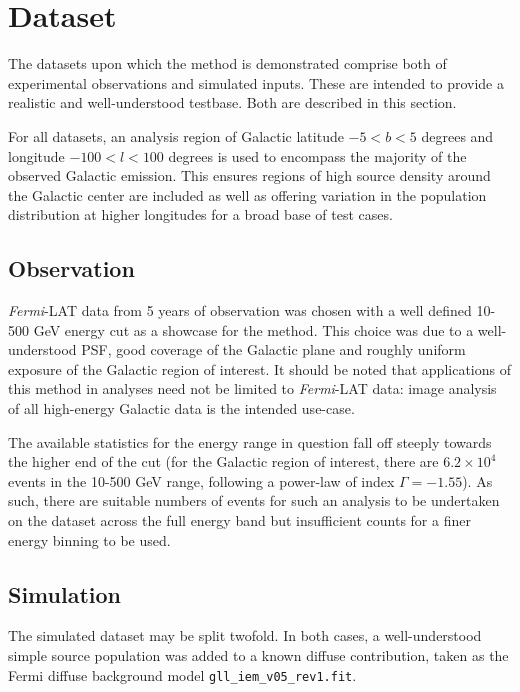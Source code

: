 \documentclass{PoS}
\begin{document}
\section{Dataset}

The datasets upon which the method is demonstrated comprise both of experimental observations and simulated inputs. These are intended to provide a realistic and well-understood testbase. Both are described in this section.

For all datasets, an analysis region of Galactic latitude $-5 < b < 5$ degrees and longitude $-100 < l < 100$ degrees is used to encompass the majority of the observed Galactic emission. This ensures regions of high source density around the Galactic center are included as well as offering variation in the population distribution at higher longitudes for a broad base of test cases.


\subsection{Observation}

\textit{Fermi}-LAT data from 5 years of observation was chosen with a well defined 10-500 GeV energy cut as a showcase for the method. This choice was due to a well-understood PSF, good coverage of the Galactic plane and roughly uniform exposure of the Galactic region of interest. It should be noted that applications of this method in analyses need not be limited to \textit{Fermi}-LAT data: image analysis of all high-energy Galactic data is the intended use-case.

The available statistics for the energy range in question fall off steeply towards the higher end of the cut (for the Galactic region of interest, there are $6.2 \times 10^4$ events in the 10-500 GeV range, following a power-law of index $\Gamma = -1.55$). As such, there are suitable numbers of events for such an analysis to be undertaken on the dataset across the full energy band but insufficient counts for a finer energy binning to be used.

\subsection{Simulation}

The simulated dataset may be split twofold. In both cases, a well-understood simple source population was added to a known diffuse contribution, taken as the Fermi diffuse background model \verb|gll_iem_v05_rev1.fit|.
\end{document}
